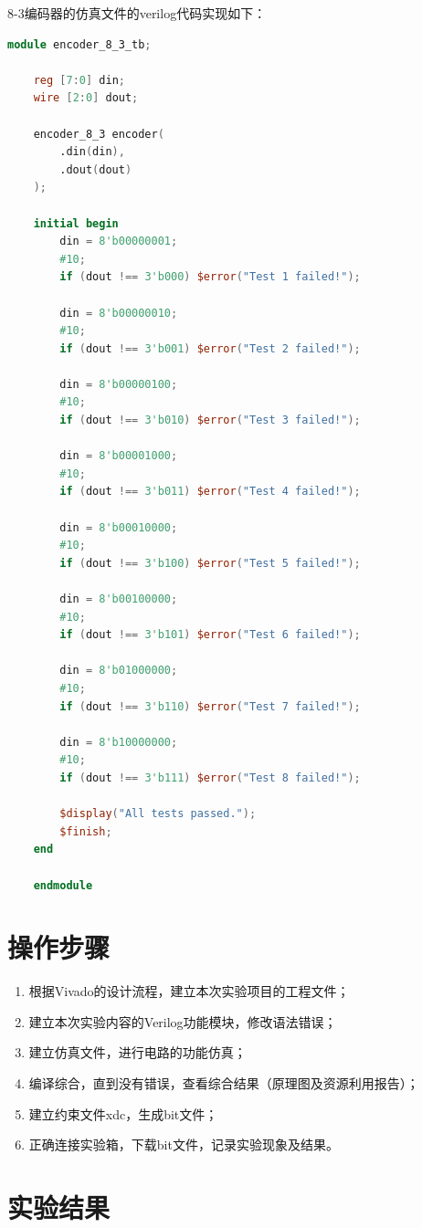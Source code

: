 \documentclass{experiment}
\begin{document}
8-3编码器的仿真文件的verilog代码实现如下：
\begin{lstlisting}[language=verilog]
	module encoder_8_3_tb;
	
	reg [7:0] din;
	wire [2:0] dout;
	
	encoder_8_3 encoder(
		.din(din),
		.dout(dout)
	);
	
	initial begin
		din = 8'b00000001;
		#10;
		if (dout !== 3'b000) $error("Test 1 failed!");
		
		din = 8'b00000010;
		#10;
		if (dout !== 3'b001) $error("Test 2 failed!");
		
		din = 8'b00000100;
		#10;
		if (dout !== 3'b010) $error("Test 3 failed!");
		
		din = 8'b00001000;
		#10;
		if (dout !== 3'b011) $error("Test 4 failed!");
		
		din = 8'b00010000;
		#10;
		if (dout !== 3'b100) $error("Test 5 failed!");
		
		din = 8'b00100000;
		#10;
		if (dout !== 3'b101) $error("Test 6 failed!");
		
		din = 8'b01000000;
		#10;
		if (dout !== 3'b110) $error("Test 7 failed!");
		
		din = 8'b10000000;
		#10;
		if (dout !== 3'b111) $error("Test 8 failed!");
		
		$display("All tests passed.");
		$finish;
	end
	
	endmodule
\end{lstlisting}

\section{操作步骤}

\begin{enumerate}
\item 根据Vivado的设计流程，建立本次实验项目的工程文件；
\item 建立本次实验内容的Verilog功能模块，修改语法错误；
\item 建立仿真文件，进行电路的功能仿真；
\item 编译综合，直到没有错误，查看综合结果（原理图及资源利用报告）；
\item 建立约束文件xdc，生成bit文件；
\item 正确连接实验箱，下载bit文件，记录实验现象及结果。
\end{enumerate}

\section{实验结果}
\end{document}
